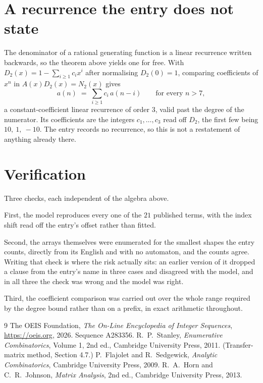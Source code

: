 \documentclass[11pt,a4paper]{article}
\theoremstyle{plain}
\theoremstyle{definition}
\begin{document}
\section{A recurrence the entry does not state}

The denominator of a rational generating function is a linear recurrence written backwards, so
the theorem above yields one for free. With $D_2(x)=1-\sum_{i\ge1}c_ix^i$ after normalising
$D_2(0)=1$, comparing coefficients of $x^n$ in $A(x)D_2(x)=N_2(x)$ gives
\[
a(n)\;=\;\sum_{i\ge1}c_i\,a(n-i)\qquad\text{for every }n>7,
\]
a constant-coefficient linear recurrence of order $3$, valid past the degree of the
numerator. Its coefficients are the integers $c_1,\dots,c_{3}$ read off $D_2$, the first few being $10,\ 1,\ -10$. The entry records no recurrence, so this is not a restatement of anything
already there.

\section{Verification}

Three checks, each independent of the algebra above.

First, the model reproduces every one of the $21$ published terms, with the index shift
read off the entry's offset rather than fitted.

Second, the arrays themselves were enumerated for the smallest shapes the entry counts,
directly from its English and with no automaton, and the counts agree. Writing that check is
where the risk actually sits: an earlier version of it dropped a clause from the entry's name
in three cases and disagreed with the model, and in all three the check was wrong and the model
was right.

Third, the coefficient comparison was carried out over the whole range required by the degree
bound rather than on a prefix, in exact arithmetic throughout.

\begin{thebibliography}{9}
 The OEIS Foundation, \emph{The On-Line Encyclopedia of Integer
Sequences}, \url{https://oeis.org}, 2026. Sequence A283356.
 R.~P.~Stanley, \emph{Enumerative Combinatorics}, Volume 1, 2nd ed.,
Cambridge University Press, 2011. (Transfer-matrix method, Section 4.7.)
 P.~Flajolet and R.~Sedgewick, \emph{Analytic Combinatorics}, Cambridge
University Press, 2009.
 R.~A.~Horn and C.~R.~Johnson, \emph{Matrix Analysis}, 2nd ed., Cambridge
University Press, 2013.
\end{thebibliography}
\end{document}
